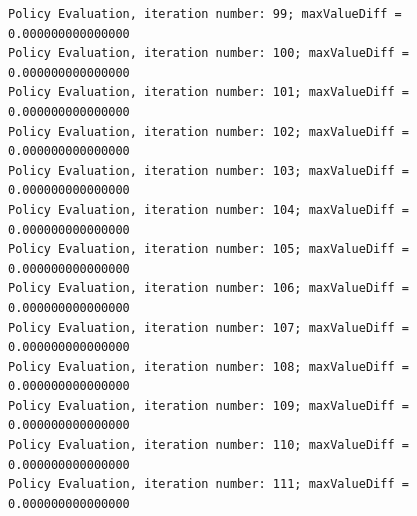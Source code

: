 \documentclass{article}
\begin{document}
\begin{scriptsize}
\begin{verbatim}
Policy Evaluation, iteration number: 99; maxValueDiff = 0.000000000000000 
Policy Evaluation, iteration number: 100; maxValueDiff = 0.000000000000000 
Policy Evaluation, iteration number: 101; maxValueDiff = 0.000000000000000 
Policy Evaluation, iteration number: 102; maxValueDiff = 0.000000000000000 
Policy Evaluation, iteration number: 103; maxValueDiff = 0.000000000000000 
Policy Evaluation, iteration number: 104; maxValueDiff = 0.000000000000000 
Policy Evaluation, iteration number: 105; maxValueDiff = 0.000000000000000 
Policy Evaluation, iteration number: 106; maxValueDiff = 0.000000000000000 
Policy Evaluation, iteration number: 107; maxValueDiff = 0.000000000000000 
Policy Evaluation, iteration number: 108; maxValueDiff = 0.000000000000000 
Policy Evaluation, iteration number: 109; maxValueDiff = 0.000000000000000 
Policy Evaluation, iteration number: 110; maxValueDiff = 0.000000000000000 
Policy Evaluation, iteration number: 111; maxValueDiff = 0.000000000000000 
\end{verbatim}
\end{scriptsize}
\end{document}
